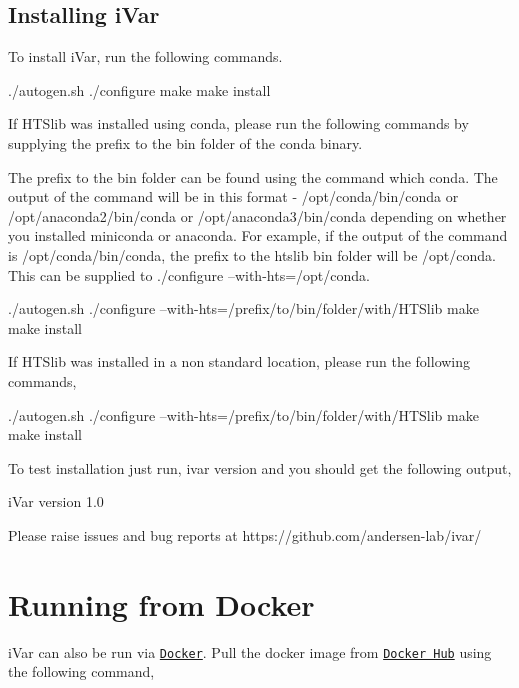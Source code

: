 \hypertarget{installpage_autotoc_md10}{}\subsection{Installing i\+Var}\label{installpage_autotoc_md10}
To install i\+Var, run the following commands.


\begin{DoxyCode}
./autogen.sh
./configure
make
make install
\end{DoxyCode}


If H\+T\+Slib was installed using conda, please run the following commands by supplying the prefix to the bin folder of the conda binary.

The prefix to the bin folder can be found using the command {\ttfamily which conda}. The output of the command will be in this format -\/ /opt/conda/bin/conda or /opt/anaconda2/bin/conda or /opt/anaconda3/bin/conda depending on whether you installed miniconda or anaconda. For example, if the output of the command is /opt/conda/bin/conda, the prefix to the htslib bin folder will be /opt/conda. This can be supplied to ./configure --with-\/hts=/opt/conda.


\begin{DoxyCode}
./autogen.sh
./configure --with-hts=/prefix/to/bin/folder/with/HTSlib
make
make install
\end{DoxyCode}


If H\+T\+Slib was installed in a non standard location, please run the following commands,


\begin{DoxyCode}
./autogen.sh
./configure --with-hts=/prefix/to/bin/folder/with/HTSlib
make
make install
\end{DoxyCode}


To test installation just run, {\ttfamily ivar version} and you should get the following output,


\begin{DoxyCode}
iVar version 1.0

Please raise issues and bug reports at https://github.com/andersen-lab/ivar/
\end{DoxyCode}
\hypertarget{installpage_autotoc_md11}{}\section{Running from Docker}\label{installpage_autotoc_md11}
i\+Var can also be run via \href{https://www.docker.com/}{\tt Docker}. Pull the docker image from \href{https://hub.docker.com/}{\tt Docker Hub} using the following command,


